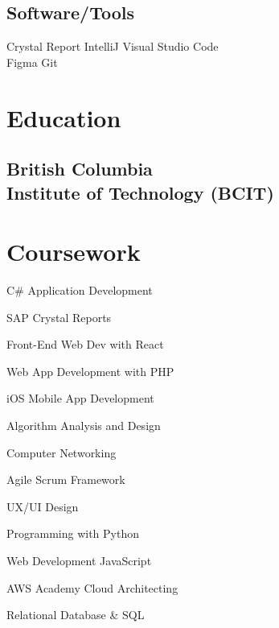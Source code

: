 \documentclass[]{plushcv}
\begin{document}
\begin{minipage}[t]{0.36\textwidth}
\subsection{Software/Tools}
\sectionsep
Crystal Report \textbullet{} IntelliJ \textbullet{} Visual Studio Code  \\ \textbullet{} Figma  \textbullet{}  Git \\

\sectionsep


\section{Education} 
\subsection{British Columbia \\Institute of Technology (BCIT)}
\sectionsep



\section{Coursework}
\begin{tightemize}
\sectionsep
\item C\# Application Development
\item SAP Crystal Reports
\item Front-End Web Dev with React
\item Web App Development with PHP
\item iOS Mobile App Development
\item Algorithm Analysis and Design
\item Computer Networking
\item Agile Scrum Framework
\item UX/UI Design
\item Programming with Python
\item Web Development JavaScript
\item AWS Academy Cloud Architecting
\item Relational Database \& SQL

\end{tightemize}
\sectionsep


\end{minipage} 
\end{document}
